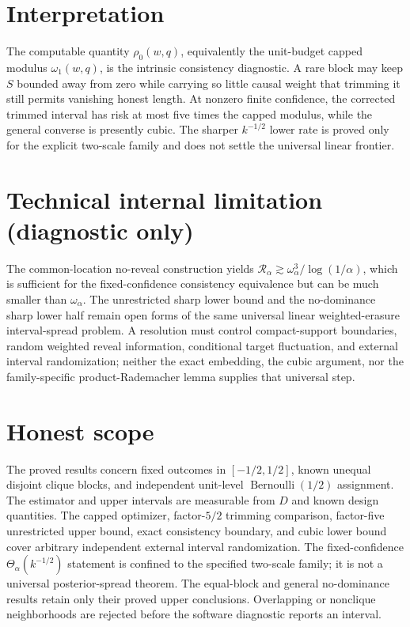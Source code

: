 \documentclass{article}
\begin{document}
\section{Interpretation}

The computable quantity \(\rho_0(w,q)\), equivalently the unit-budget capped modulus \(\omega_1(w,q)\), is the intrinsic consistency diagnostic. A rare block may keep \(S\) bounded away from zero while carrying so little causal weight that trimming it still permits vanishing honest length. At nonzero finite confidence, the corrected trimmed interval has risk at most five times the capped modulus, while the general converse is presently cubic. The sharper \(k^{-1/2}\) lower rate is proved only for the explicit two-scale family and does not settle the universal linear frontier.

\section*{Technical internal limitation (diagnostic only)}

The common-location no-reveal construction yields \(\mathcal R_\alpha\gtrsim\omega_\alpha^3/\log(1/\alpha)\), which is sufficient for the fixed-confidence consistency equivalence but can be much smaller than \(\omega_\alpha\). The unrestricted sharp lower bound and the no-dominance sharp lower half remain open forms of the same universal linear weighted-erasure interval-spread problem. A resolution must control compact-support boundaries, random weighted reveal information, conditional target fluctuation, and external interval randomization; neither the exact embedding, the cubic argument, nor the family-specific product-Rademacher lemma supplies that universal step.

\section{Honest scope}

The proved results concern fixed outcomes in \([-1/2,1/2]\), known unequal disjoint clique blocks, and independent unit-level \(\operatorname{Bernoulli}(1/2)\) assignment. The estimator and upper intervals are measurable from \(D\) and known design quantities. The capped optimizer, factor-\(5/2\) trimming comparison, factor-five unrestricted upper bound, exact consistency boundary, and cubic lower bound cover arbitrary independent external interval randomization. The fixed-confidence \(\Theta_\alpha(k^{-1/2})\) statement is confined to the specified two-scale family; it is not a universal posterior-spread theorem. The equal-block and general no-dominance results retain only their proved upper conclusions. Overlapping or nonclique neighborhoods are rejected before the software diagnostic reports an interval.
\end{document}
